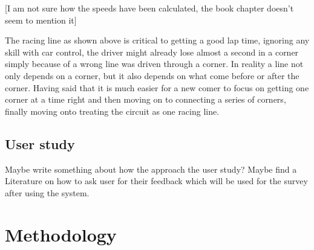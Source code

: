 \documentclass{article}
\begin{document}
{\color{red}[I am not sure how the speeds have been calculated, the book chapter doesn't seem to mention it]}

The racing line as shown above is critical to getting a good lap time, ignoring any skill with car control, the driver might already lose almost a second in a corner simply because of a wrong line was driven through a corner. In reality a line not only depends on a corner, but it also depends on what come before or after the corner. Having said that it is much easier for a new comer to focus on getting one corner at a time right and then moving on to connecting a series of corners, finally moving onto treating the circuit as one racing line\cite{beckman1991physics}\cite{GoingFaster}.


\subsection{User study}
Maybe write something about how the approach the user study? Maybe find a Literature on how to ask user for their feedback which will be used for the survey after using the system.

\newpage
\section{Methodology}

\newpage
{}

\end{document}
